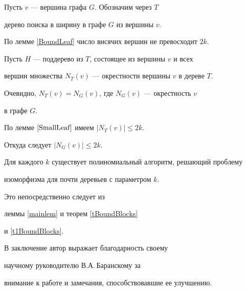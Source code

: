 \begin{pf}


Пусть $v$ --- вершина графа $G$. Обозначим через $T$ 


дерево поиска в ширину в графе $G$ из вершины $v$.


По лемме \ref{BoundLeaf} число висячих вершин не превосходит $2k$.


Пусть $H$ --- поддерево из $T$, состоящее из вершины $v$ и всех


вершин множества $N_T(v)$ --- окрестности вершины $v$ в дереве $T$.


Очевидно, $N_T(v)=N_G(v)$, где $N_G(v)$ --- окрестность $v$


в графе $G$.


По лемме $\ref{SmallLeaf}$ имеем $|N_T(v)|\le 2k$.


Откуда следует $|N_G(v)|\le 2k$.


\end{pf}





\begin{thms}


Для каждого $k$ существует полиномиальный алгоритм, решающий проблему


изоморфизма для почти деревьев с параметром $k$.


\end{thms}





Это непосредственно следует из


леммы \ref{mainlem} и теорем \ref{tBoundBlocks}


и \ref{t1BoundBlocks}.





В заключение автор выражает благодарность своему


научному руководителю В.А.\,Ба\-ран\-ско\-му за


внимание к работе и замечания, способствовавшие ее улучшению.








